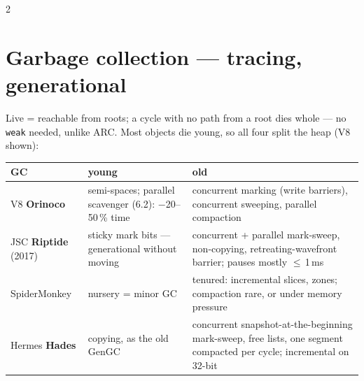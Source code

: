\documentclass[8pt]{extarticle}
\newcommand\ct[1]{\texttt{#1}}
\begin{document}
\begin{multicols}{2}
\section{Garbage collection — tracing, generational}
Live = reachable from roots; a cycle with no path from a root dies whole — no \ct{weak}
needed, unlike ARC. Most objects die young, so all four split the heap (V8 shown):

\par

{\scriptsize\setlength{\tabcolsep}{2pt}
\begin{tabular}{@{}>{\raggedright\arraybackslash}p{12mm}>{\raggedright\arraybackslash}p{22mm}>{\raggedright\arraybackslash}p{43mm}@{}}
\toprule
\textbf{GC} & \textbf{young} & \textbf{old}\\
\midrule
V8 \textbf{Orinoco} & semi-spaces; parallel scavenger (6.2): $-$20–50\,\% time & concurrent marking (write barriers), concurrent sweeping, parallel compaction\\
JSC \textbf{Riptide} (2017) & sticky mark bits — generational without moving & concurrent + parallel mark-sweep, non-copying, retreating-wavefront barrier; pauses mostly $\le$\,1\,ms\\
SpiderMonkey & nursery = minor GC & tenured: incremental slices, zones; compaction rare, or under memory pressure\\
Hermes \textbf{Hades} & copying, as the old GenGC & concurrent snapshot-at-the-beginning mark-sweep, free lists, one segment compacted per cycle; incremental on 32-bit\\
\bottomrule
\end{tabular}}


\end{multicols}
\end{document}
